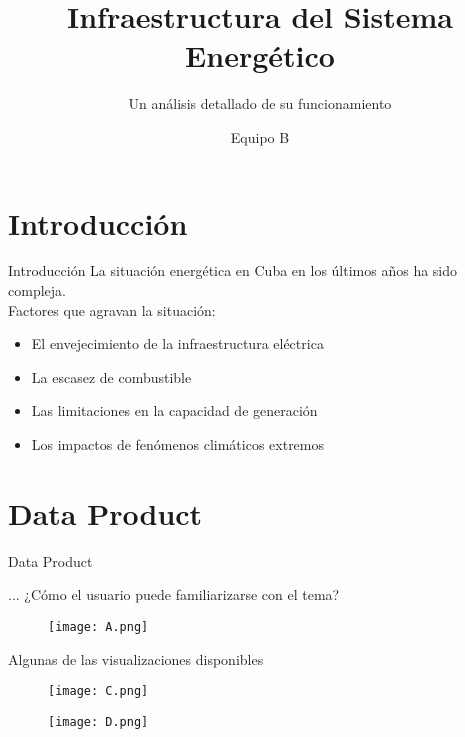 \documentclass{beamer}
\title{Infraestructura del Sistema Energético}
\subtitle{Un análisis detallado de su funcionamiento}
\author{Equipo B}
\begin{document}
\begin{frame}
    \titlepage 
\end{frame}


\section{Introducción}
\begin{frame}{Introducción}
    La situación energética en Cuba en los últimos años ha sido compleja.\\
    \vspace{0.5cm}
    Factores que agravan la situación:\\
    \begin{itemize}
        \item El envejecimiento de la infraestructura eléctrica
        \item La escasez de combustible
        \item Las limitaciones en la capacidad de generación
        \item Los impactos de fenómenos climáticos extremos
    \end{itemize}
\end{frame}

\section{Data Product}
\begin{frame}{Data Product}
    \begin{block}{...}
        ¿Cómo el usuario puede familiarizarse con el tema?
    \end{block}
    \vspace{1cm}
   \begin{figure}[h]
  \centering
  \texttt{[image: A.png]}
\end{figure}
\end{frame} 
\centering

    \begin{frame}{Algunas de las visualizaciones disponibles}
     \begin{figure}[h]
    \centering
    \texttt{[image: C.png]}
    \end{figure}
    \vspace{0.5cm}
    \begin{figure}[h]
    \centering
    \texttt{[image: D.png]}
    \end{figure}
    \end{frame}
   
\end{document}
